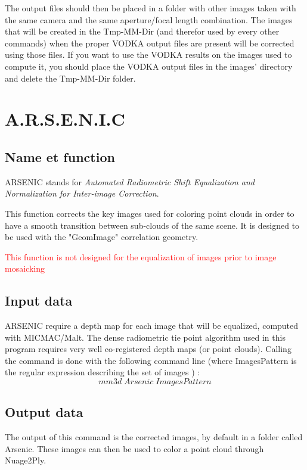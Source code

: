 The output files should then be placed in a folder with other images taken with the same camera and the same aperture/focal length combination. The images that will be created in the Tmp-MM-Dir (and therefor used by every other commands) when the proper VODKA output files are present will be corrected using those files. If you want to use the VODKA results on the images used to compute it, you should place the VODKA output files in the images' directory and delete the Tmp-MM-Dir folder.

\section{A.R.S.E.N.I.C}
\label{A.R.S.E.N.I.C.}
\subsection{Name et function}
ARSENIC stands for \textit{Automated Radiometric Shift Equalization and Normalization for Inter-image Correction}.


This function corrects the key images used for coloring point clouds in order to have a smooth transition between sub-clouds of the same scene. It is designed to be used with the "GeomImage" correlation geometry. 


\textcolor{red}{ This function is not designed for the equalization of images prior to image mosaicking}

\subsection{Input data}
\label{inputArsenic}

ARSENIC require a depth map for each image that will be equalized, computed with MICMAC/Malt. The dense radiometric tie point algorithm used in this program requires very well co-registered depth maps (or point clouds).
Calling the command is done with the following command line (where ImagesPattern is the regular expression describing the set of images ) :\[mm3d\;Arsenic\;ImagesPattern\] 

\subsection{Output data}
The output of this command is the corrected images, by default in a folder called Arsenic. These images can then be used to color a point cloud through Nuage2Ply.

